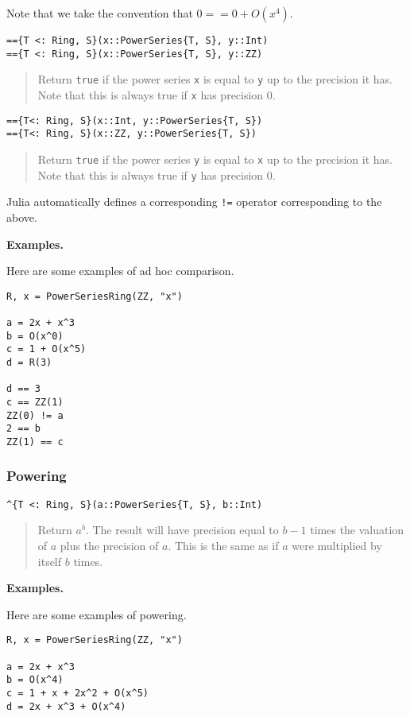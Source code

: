 \documentclass[a4paper,10pt]{article}
\newcommand{\code}{\lstinline}
\newcommand{\desc}[1]{\vspace{-3mm}\begin{quote}#1\end{quote}}
\begin{document}
{{{Note that we take the convention that $0 == 0 + O(x^4)$.

\begin{lstlisting}
=={T <: Ring, S}(x::PowerSeries{T, S}, y::Int)
=={T <: Ring, S}(x::PowerSeries{T, S}, y::ZZ)
\end{lstlisting}

\desc{Return \code{true} if the power series \code{x} is equal to \code{y} up
to the precision it has. Note that this is always true if \code{x} has
precision $0$.}

\begin{lstlisting}
=={T<: Ring, S}(x::Int, y::PowerSeries{T, S})
=={T<: Ring, S}(x::ZZ, y::PowerSeries{T, S})
\end{lstlisting}

\desc{Return \code{true} if the power series \code{y} is equal to \code{x} up
to the precision it has. Note that this is always true if \code{y} has
precision $0$.}

Julia automatically defines a corresponding \code{!=} operator corresponding to
the above.

\textbf{Examples.}

Here are some examples of ad hoc comparison.

\begin{lstlisting}
R, x = PowerSeriesRing(ZZ, "x")

a = 2x + x^3
b = O(x^0)
c = 1 + O(x^5)
d = R(3)

d == 3
c == ZZ(1)
ZZ(0) != a
2 == b
ZZ(1) == c
\end{lstlisting}

\subsubsection{Powering}

\begin{lstlisting}
^{T <: Ring, S}(a::PowerSeries{T, S}, b::Int)
\end{lstlisting}

\desc{Return $a^b$. The result will have precision equal to $b - 1$ times the
valuation of $a$ plus the precision of $a$. This is the same as if $a$ were
multiplied by itself $b$ times.}

\textbf{Examples.}

Here are some examples of powering.

\begin{lstlisting}
R, x = PowerSeriesRing(ZZ, "x")

a = 2x + x^3
b = O(x^4)
c = 1 + x + 2x^2 + O(x^5)
d = 2x + x^3 + O(x^4)


\end{lstlisting}}}}
\end{document}
